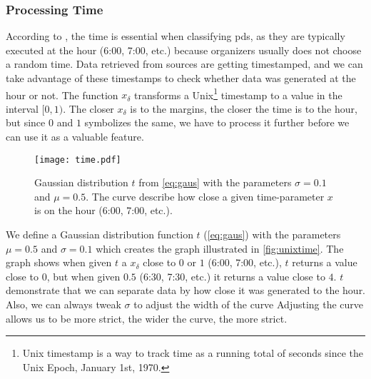 \subsubsection{Processing Time}
According to \cite{P&D_anatomy}, the time is essential when classifying \acp{pd}, as they are typically executed at the hour (6:00, 7:00, etc.) because organizers usually does not choose a random time. Data retrieved from sources are getting timestamped, and we can take advantage of these timestamps to check whether data was generated at the hour or not. The function $x_\delta$ transforms a Unix\footnote{Unix timestamp is a way to track time as a running total of seconds since the Unix Epoch, January 1st, 1970.} timestamp to a value in the interval $[0, 1)$. The closer $x_\delta$ is to the margins, the closer the time is to the hour, but since $0$ and $1$ symbolizes the same, we have to process it further before we can use it as a valuable feature.

\begin{figure}
    \centering
    \texttt{[image: time.pdf]}
    \caption[\project's time curve]{Gaussian distribution $t$ from \autoref{eq:gaus} with the parameters $\sigma=0.1$ and $\mu=0.5$. The curve describe how close a given time-parameter $x$ is on the hour (6:00, 7:00, etc.).}
    \label{fig:unixtime}
\end{figure}



We define a Gaussian distribution function $t$ (\autoref{eq:gaus}) with the parameters $\mu=0.5$ and $\sigma=0.1$ which creates the graph illustrated in \autoref{fig:unixtime}. The graph shows when given $t$ a $x_\delta$ close to $0$ or $1$ (6:00, 7:00, etc.), $t$ returns a value close to $0$, but when given $0.5$ (6:30, 7:30, etc.) it returns a value close to $4$. $t$ demonstrate that we can separate data by how close it was generated to the hour. Also, we can always tweak $\sigma$ to adjust the width of the curve Adjusting the curve allows us to be more strict, the wider the curve, the more strict.

